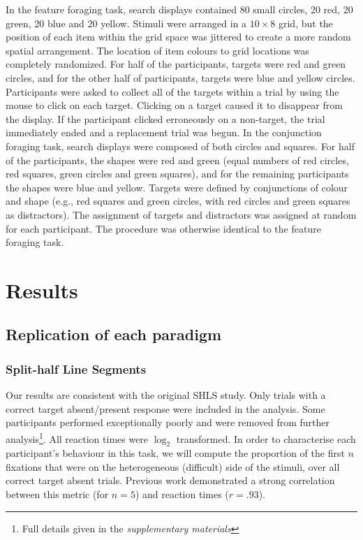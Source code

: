 \documentclass[]{rsos}%
\begin{document}
In the feature foraging task, search displays contained 80 small circles, 20 red, 20 green, 20 blue  and 20 yellow. Stimuli were arranged in a $10 \times 8$ grid, but the position of each item within the grid space was jittered to create a more random spatial arrangement. The location of item colours to grid locations was completely randomized. For half of the participants, targets were red and green circles, and for the other half of participants, targets were blue and yellow circles. Participants were asked to collect all of the targets within a trial by using the mouse to click on each target. Clicking on a target caused it to disappear from the display. If the participant clicked erroneously on a non-target, the trial immediately ended and a replacement trial was begun. In the conjunction foraging task, search displays were composed of both circles and squares. For half of the participants, the shapes were red and green (equal numbers of red circles, red squares, green circles and green squares), and for the remaining participants the shapes were blue and yellow. Targets were defined by conjunctions of colour and shape (e.g., red squares and green circles, with red circles and green squares as distractors). The assignment of targets and distractors was assigned at random for each participant. The procedure was otherwise identical to the feature foraging task. 

\section{Results}

\subsection{Replication of each paradigm}

\subsubsection{Split-half Line Segments}

Our results are consistent with the original SHLS study\cite{nowakowska2017}. Only trials with a correct target absent/present response were included in the analysis. Some participants performed exceptionally poorly and were removed from further analysis\footnote{Full details given in the \textit{supplementary materials}}. All reaction times were $\log_2$ transformed. In order to characterise each participant's behaviour in this task, we will compute the proportion of the first $n$ fixations that were on the heterogeneous (difficult) side of the stimuli, over all correct target absent trials. Previous work\cite{nowakowska2017} demonstrated a strong correlation between this metric (for $n=5$) and reaction times ($r=.93$).
\end{document}
